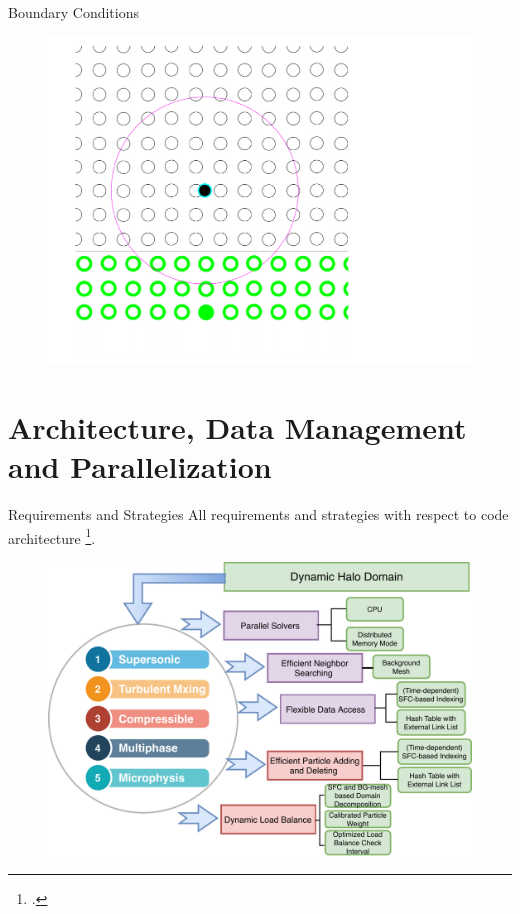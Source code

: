 \documentclass{beamer}
\begin{document}
\begin{frame}{Boundary Conditions}
\begin{minipage}{0.325\textwidth}
\begin{figure}
\includegraphics[width=0.99 \textwidth]{./PPT/BC_wall1}
\end{figure}
\end{minipage}
\end{frame}

\section{Architecture, Data Management and Parallelization}
\begin{frame}{Requirements and Strategies}
All requirements and strategies with respect to code architecture \footcite{cao2017data}.
\begin{figure}[!t]
\centering
\includegraphics[width=0.83 \textwidth]{./PPT/Requirement_all}
\label{fig:Requirements}
\end{figure}
\end{frame}
\end{document}
